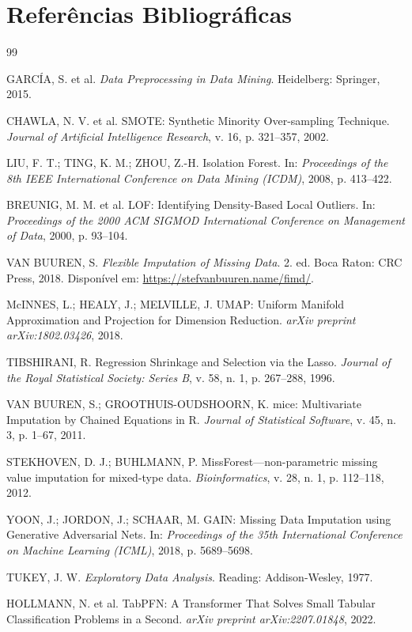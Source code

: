 \documentclass[12pt,a4paper]{article}
\begin{document}
\section{Referências Bibliográficas}

\begin{thebibliography}{99}

GARCÍA, S. et al. \textit{Data Preprocessing in Data Mining}. Heidelberg: Springer, 2015.

CHAWLA, N. V. et al. SMOTE: Synthetic Minority Over-sampling Technique. \textit{Journal of Artificial Intelligence Research}, v. 16, p. 321--357, 2002.

LIU, F. T.; TING, K. M.; ZHOU, Z.-H. Isolation Forest. In: \textit{Proceedings of the 8th IEEE International Conference on Data Mining (ICDM)}, 2008, p. 413--422.

BREUNIG, M. M. et al. LOF: Identifying Density-Based Local Outliers. In: \textit{Proceedings of the 2000 ACM SIGMOD International Conference on Management of Data}, 2000, p. 93--104.

VAN BUUREN, S. \textit{Flexible Imputation of Missing Data}. 2. ed. Boca Raton: CRC Press, 2018. Disponível em: \url{https://stefvanbuuren.name/fimd/}.

McINNES, L.; HEALY, J.; MELVILLE, J. UMAP: Uniform Manifold Approximation and Projection for Dimension Reduction. \textit{arXiv preprint arXiv:1802.03426}, 2018.

TIBSHIRANI, R. Regression Shrinkage and Selection via the Lasso. \textit{Journal of the Royal Statistical Society: Series B}, v. 58, n. 1, p. 267--288, 1996.

VAN BUUREN, S.; GROOTHUIS-OUDSHOORN, K. mice: Multivariate Imputation by Chained Equations in R. \textit{Journal of Statistical Software}, v. 45, n. 3, p. 1--67, 2011.

STEKHOVEN, D. J.; BUHLMANN, P. MissForest---non-parametric missing value imputation for mixed-type data. \textit{Bioinformatics}, v. 28, n. 1, p. 112--118, 2012.

YOON, J.; JORDON, J.; SCHAAR, M. GAIN: Missing Data Imputation using Generative Adversarial Nets. In: \textit{Proceedings of the 35th International Conference on Machine Learning (ICML)}, 2018, p. 5689--5698.

TUKEY, J. W. \textit{Exploratory Data Analysis}. Reading: Addison-Wesley, 1977.

HOLLMANN, N. et al. TabPFN: A Transformer That Solves Small Tabular Classification Problems in a Second. \textit{arXiv preprint arXiv:2207.01848}, 2022.

\end{thebibliography}
\end{document}
